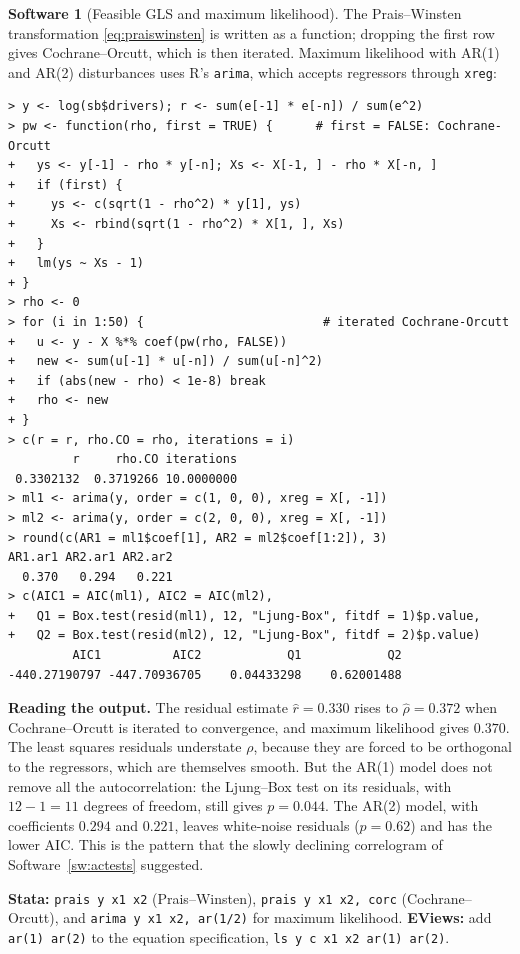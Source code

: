 \documentclass[11pt,a4paper]{article}
\numberwithin{equation}{section}
\theoremstyle{definition}
\newtheorem{software}[thm]{Software}
\begin{document}
\begin{software}[Feasible GLS and maximum likelihood]
\label{sw:acest}
The Prais--Winsten transformation \eqref{eq:praiswinsten} is written as a function; dropping the first row gives Cochrane--Orcutt, which is then iterated.
Maximum likelihood with AR(1) and AR(2) disturbances uses R's \texttt{arima}, which accepts regressors through \texttt{xreg}:
{\small\begin{verbatim}
> y <- log(sb$drivers); r <- sum(e[-1] * e[-n]) / sum(e^2)
> pw <- function(rho, first = TRUE) {      # first = FALSE: Cochrane-Orcutt
+   ys <- y[-1] - rho * y[-n]; Xs <- X[-1, ] - rho * X[-n, ]
+   if (first) {
+     ys <- c(sqrt(1 - rho^2) * y[1], ys)
+     Xs <- rbind(sqrt(1 - rho^2) * X[1, ], Xs)
+   }
+   lm(ys ~ Xs - 1)
+ }
> rho <- 0
> for (i in 1:50) {                         # iterated Cochrane-Orcutt
+   u <- y - X %*% coef(pw(rho, FALSE))
+   new <- sum(u[-1] * u[-n]) / sum(u[-n]^2)
+   if (abs(new - rho) < 1e-8) break
+   rho <- new
+ }
> c(r = r, rho.CO = rho, iterations = i)
         r     rho.CO iterations 
 0.3302132  0.3719266 10.0000000 
> ml1 <- arima(y, order = c(1, 0, 0), xreg = X[, -1])
> ml2 <- arima(y, order = c(2, 0, 0), xreg = X[, -1])
> round(c(AR1 = ml1$coef[1], AR2 = ml2$coef[1:2]), 3)
AR1.ar1 AR2.ar1 AR2.ar2 
  0.370   0.294   0.221 
> c(AIC1 = AIC(ml1), AIC2 = AIC(ml2),
+   Q1 = Box.test(resid(ml1), 12, "Ljung-Box", fitdf = 1)$p.value,
+   Q2 = Box.test(resid(ml2), 12, "Ljung-Box", fitdf = 2)$p.value)
         AIC1          AIC2            Q1            Q2 
-440.27190797 -447.70936705    0.04433298    0.62001488 
\end{verbatim}}
\textbf{Reading the output.} The residual estimate $\hat r = 0.330$ rises to $\hat\rho = 0.372$ when Cochrane--Orcutt is iterated to convergence, and maximum
likelihood gives $0.370$. The least squares residuals understate $\rho$, because they are forced to be orthogonal to the regressors, which are themselves
smooth. But the AR(1) model does not remove all the autocorrelation: the Ljung--Box test on its residuals, with $12 - 1 = 11$ degrees of freedom, still
gives $p = 0.044$. The AR(2) model, with coefficients $0.294$ and $0.221$, leaves white-noise residuals ($p = 0.62$) and has the lower AIC. This is the
pattern that the slowly declining correlogram of Software~\ref{sw:actests} suggested.

\textbf{Stata:} \texttt{prais y x1 x2} (Prais--Winsten), \texttt{prais y x1 x2, corc} (Cochrane--Orcutt), and \texttt{arima y x1 x2, ar(1/2)} for maximum
likelihood. \textbf{EViews:} add \texttt{ar(1) ar(2)} to the equation specification, \texttt{ls y c x1 x2 ar(1) ar(2)}.
\end{software}
\end{document}
